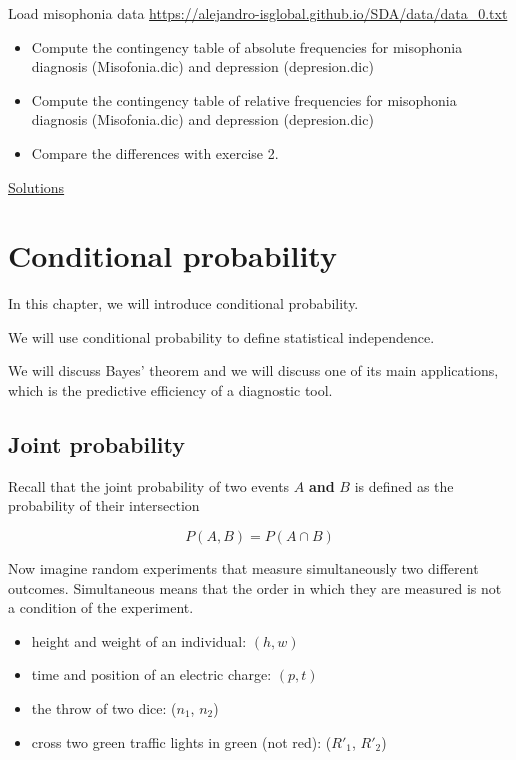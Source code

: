 \documentclass[
]{book}
\begin{document}
Load misophonia data \url{https://alejandro-isglobal.github.io/SDA/data/data_0.txt}

\begin{itemize}
\item
  Compute the contingency table of absolute frequencies for misophonia diagnosis (Misofonia.dic) and depression (depresion.dic)
\item
  Compute the contingency table of relative frequencies for misophonia diagnosis (Misofonia.dic) and depression (depresion.dic)
\item
  Compare the differences with exercise 2.
\end{itemize}

\href{https://colab.research.google.com/drive/1ncTaoBgskCJcBIb0-PdnbUFr_AKU0XRF?usp=sharing}{Solutions}

\hypertarget{conditional-probability}{%
\chapter{Conditional probability}\label{conditional-probability}}

In this chapter, we will introduce conditional probability.

We will use conditional probability to define statistical independence.

We will discuss Bayes' theorem and we will discuss one of its main applications, which is the predictive efficiency of a diagnostic tool.

\hypertarget{joint-probability}{%
\section{Joint probability}\label{joint-probability}}

Recall that the joint probability of two events \(A\) \textbf{and} \(B\) is defined as the probability of their intersection

\[P( A ,B )=P(A \cap B)\]

Now imagine random experiments that measure simultaneously two different outcomes. Simultaneous means that the order in which they are measured is not a condition of the experiment.

\begin{itemize}
\item
  height and weight of an individual: \((h, w)\)
\item
  time and position of an electric charge: \((p, t)\)
\item
  the throw of two dice: (\(n_1\), \(n_2\))
\item
  cross two green traffic lights in green (not red): (\(R'_1\), \(R'_2\))
\end{itemize}
\end{document}
